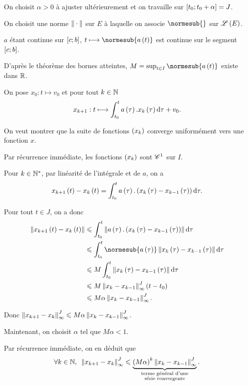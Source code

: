 \begin{dem}[Cas particulier : \(I=\intervii{c}{b}\) est un compact]
On choisit \(\alpha>0\) à ajuster ultérieurement et on travaille sur \(\left[t_0;t_0+\alpha\right]=J\).

On choisit une norme \(\norme{}\) sur \(E\) à laquelle on associe \(\normesub{}\) sur \(\mathscr{L}\left(E\right)\).

\(a\) étant continue sur \(\left[c;b\right]\), \(t\mapsto\normesub{a\paren{t}}\) est continue sur le segment \(\left[c;b\right]\).

D'après le théorème des bornes atteintes, \(M=\sup_{t\in I}\normesub{a\paren{t}}\) existe dans \(\mathbb{R}\).

On pose \(x_0:t\mapsto v_0\) et pour tout \(k\in\mathbb{N}\) \[x_{k+1}:t\mapsto\int_{t_0}^ta\paren{\tau}.x_k\paren{\tau}\odif{\tau}+v_0.\]

On veut montrer que la suite de fonctions \(\left(x_k\right)\) converge uniformément vers une fonction \(x\).

Par récurrence immédiate, les fonctions \(\left(x_k\right)\) sont \(\mathscr{C}^{1}\) sur \(I\).

Pour \(k\in\mathbb{N}^*\), par linéarité de l'intégrale et de \(a\), on a \[x_{k+1}\paren{t}-x_k\paren{t}=\int_{t_0}^ta\paren{\tau}.\paren{x_k\paren{\tau}-x_{k-1}\paren{\tau}}\odif{\tau}.\]

Pour tout \(t\in J\), on a donc \[\begin{aligned}
\norme{x_{k+1}\paren{t}-x_k\paren{t}}&\leq\int_{t_0}^t\norme{a\paren{\tau}.\paren{x_k\paren{\tau}-x_{k-1}\paren{\tau}}}\odif{\tau} \\
&\leq\int_{t_0}^t\normesub{a\paren{\tau}}\norme{x_k\paren{\tau}-x_{k-1}\paren{\tau}}\odif{\tau} \\
&\leq M\int_{t_0}^t\norme{x_k\paren{\tau}-x_{k-1}\paren{\tau}}\odif{\tau} \\
&\leq M\norme{x_k-x_{k-1}}_\infty^J\paren{t-t_0} \\
&\leq M\alpha\norme{x_k-x_{k-1}}_\infty^J.
\end{aligned}\]

Donc \(\norme{x_{k+1}-x_k}_\infty^J\leq M\alpha\norme{x_k-x_{k-1}}_\infty^J\).

Maintenant, on choisit \(\alpha\) tel que \(M\alpha<1\).

Par récurrence immédiate, on en déduit que \[\quantifs{\forall k\in\N}\norme{x_{k+1}-x_k}_\infty^J\leq\underbrace{\paren{M\alpha}^k\norme{x_k-x_{k-1}}_\infty^J}_{\substack{\text{terme général d'une} \\ \text{série convergente}}}.\]


\end{dem}
